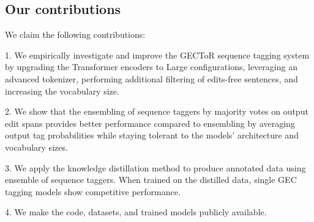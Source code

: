\documentclass[11pt]{article}
\begin{document}
\subsection{Our contributions} 

We claim the following contributions:

1. We empirically investigate and improve the GECToR sequence tagging system \cite{omelianchuk2020gector} by upgrading the Transformer encoders to Large configurations, leveraging an advanced tokenizer, performing additional filtering of edits-free sentences, and increasing the vocabulary size.

2. We show that the ensembling of sequence taggers by majority votes on output edit spans provides better performance compared to ensembling by averaging output tag probabilities while staying tolerant to the models' architecture and vocabulary sizes.

3. We apply the knowledge distillation method to produce annotated data using ensemble of sequence taggers. When trained on the distilled data, single GEC tagging models show competitive performance.

4. We make the code, datasets, and trained models publicly available.
\end{document}
